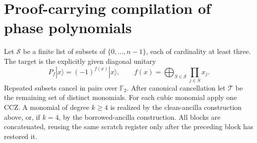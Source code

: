 \documentclass[11pt,a4paper]{article}
\begin{document}
\section{Proof-carrying compilation of phase polynomials}
Let $\mathcal S$ be a finite list of subsets of
$\{0,\ldots,n-1\}$, each of cardinality at least three.
The target is the explicitly given diagonal unitary
\begin{equation}\label{eq:phasefun}
P_f|x\rangle=(-1)^{f(x)}|x\rangle,\qquad
f(x)=\bigoplus_{S\in\mathcal S}\prod_{j\in S}x_j .
\end{equation}
Repeated subsets cancel in pairs over $\mathbb F_2$.
After canonical cancellation let $\mathcal T$ be the
remaining set of distinct monomials.
For each cubic monomial apply one CCZ.
A monomial of degree $k\ge4$ is realized by
the clean-ancilla construction above, or, if
$k=4$, by the borrowed-ancilla construction.
All blocks are concatenated, reusing the
same scratch register only after the preceding
block has restored it.
\end{document}
